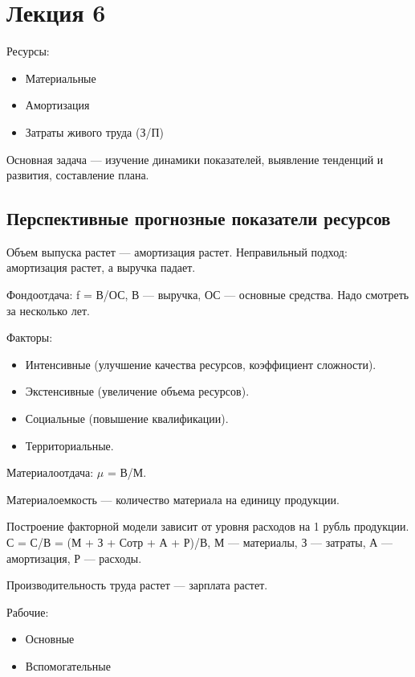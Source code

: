\documentclass[14pt]{extarticle}
\begin{document}
\title{}
\maketitle

\section*{Лекция 6}
Ресурсы:
\begin{itemize}
  \item Материальные
  \item Амортизация
  \item Затраты живого труда (З/П)
\end{itemize}

Основная задача — изучение динамики показателей, выявление тенденций и развития, составление плана.

\subsection{Перспективные прогнозные показатели ресурсов}
Объем выпуска растет — амортизация растет. Неправильный подход: амортизация растет, а выручка падает.

Фондоотдача: f = В/ОС, В — выручка, ОС — основные средства. Надо смотреть за несколько лет.

Факторы:
\begin{itemize}
  \item Интенсивные (улучшение качества ресурсов, коэффициент сложности).
  \item Экстенсивные (увеличение объема ресурсов).
  \item Социальные (повышение квалификации).
  \item Территориальные.
\end{itemize}

Материалоотдача: $\mu$ = В/М.

Материалоемкость — количество материала на единицу продукции.

Построение факторной модели зависит от уровня расходов на 1 рубль продукции. С = С/В = (М + З + Сотр + А + Р)/В, М — материалы, З — затраты, А — амортизация, Р — расходы.

Производительность труда растет — зарплата растет.

Рабочие:
\begin{itemize}
  \item Основные
  \item Вспомогательные
\end{itemize}
\end{document}
